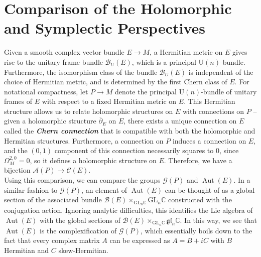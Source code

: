 \documentclass[psamsfonts, 12pt]{amsart}
\theoremstyle{definition}
\theoremstyle{remark}
\newcommand{\ib}[1]{\textbf{\textit{#1}}}
\newcommand{\C}{\mathbb{C}}
\newcommand{\dbar}{\overline{\partial}}
\newcommand{\GL}{\mathrm{GL}}
\DeclareMathOperator{\Aut}{Aut}
\begin{document}
\section{Comparison of the Holomorphic and Symplectic Perspectives}
%
%
Given a smooth complex vector bundle $E \to M$, a Hermitian metric on $E$ gives rise
to the unitary frame bundle $\mathcal{B}_U(E)$, which is a principal
$\mathrm{U}(n)$-bundle. Furthermore, the isomorphism class of the bundle
$\mathcal{B}_U(E)$ is independent of the choice of Hermitian metric, and is determined
by the first Chern class of $E$. For notational compactness, let $P \to M$ denote the
principal $\mathrm{U}(n)$-bundle of unitary frames of $E$ with respect to a fixed
Hermitian metric on $E$. This Hermitian structure allows us to relate holomorphic
structures on $E$ with connections on $P$ -- given a holomorphic structure
$\dbar_E$ on $E$, there exists a unique connection on $E$ called the
\ib{Chern connection} that is compatible with both the holomorphic and Hermitian
structures. Furthermore, a connection on $P$ induces a connection on $E$,
and the $(0,1)$ component of this connection necessarily squares to $0$, since
$\Omega^{2,0}_M = 0$, so it defines a holomorphic structure on $E$. Therefore, we
have a bijection $\mathscr{A}(P) \to \mathscr{C}(E)$. \\

Using this comparison, we can compare the groups $\mathscr{G}(P)$ and $\Aut(E)$.
In a similar fashion to $\mathscr{G}(P)$, an element of $\Aut(E)$ can be
thought of as a global section of the associated bundle
$\mathcal{B}(E) \times_{\GL_n\C} \GL_n\C$ constructed with the conjugation action.
Ignoring analytic difficulties, this identifies the Lie algebra of $\Aut(E)$ with
the global sections of $\mathcal{B}(E) \times_{\GL_n\C} \mathfrak{gl}_n\C$. In this
way, we see that $\Aut(E)$ is the complexification of $\mathscr{G}(P)$, which
essentially boils down to the fact that every complex matrix $A$ can be expressed
as $A = B + iC$ with $B$ Hermitian and $C$ skew-Hermitian. \\
\end{document}
